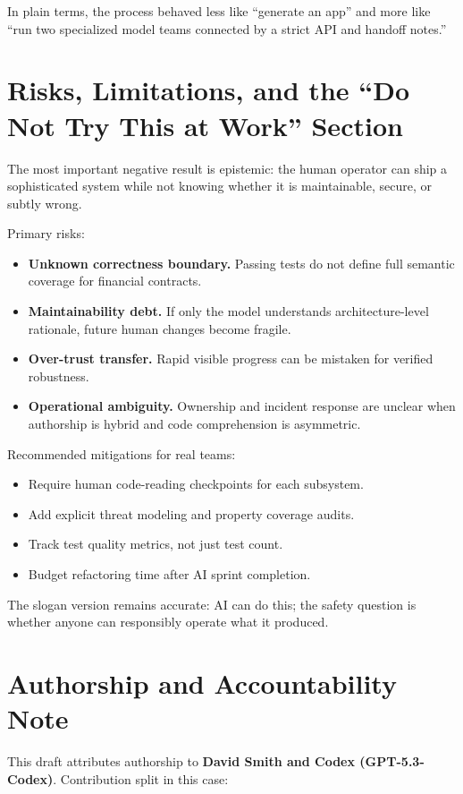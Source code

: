 \documentclass[11pt]{article}
\begin{document}
In plain terms, the process behaved less like ``generate an app'' and more like ``run two specialized model teams connected by a strict API and handoff notes.''

\section{Risks, Limitations, and the ``Do Not Try This at Work'' Section}
The most important negative result is epistemic: the human operator can ship a sophisticated system while not knowing whether it is maintainable, secure, or subtly wrong.

Primary risks:
\begin{itemize}
  \item \textbf{Unknown correctness boundary.} Passing tests do not define full semantic coverage for financial contracts.
  \item \textbf{Maintainability debt.} If only the model understands architecture-level rationale, future human changes become fragile.
  \item \textbf{Over-trust transfer.} Rapid visible progress can be mistaken for verified robustness.
  \item \textbf{Operational ambiguity.} Ownership and incident response are unclear when authorship is hybrid and code comprehension is asymmetric.
\end{itemize}

Recommended mitigations for real teams:
\begin{itemize}
  \item Require human code-reading checkpoints for each subsystem.
  \item Add explicit threat modeling and property coverage audits.
  \item Track test quality metrics, not just test count.
  \item Budget refactoring time after AI sprint completion.
\end{itemize}

The slogan version remains accurate: AI can do this; the safety question is whether anyone can responsibly operate what it produced.

\section{Authorship and Accountability Note}
This draft attributes authorship to \textbf{David Smith and Codex (GPT-5.3-Codex)}. Contribution split in this case:
\end{document}
